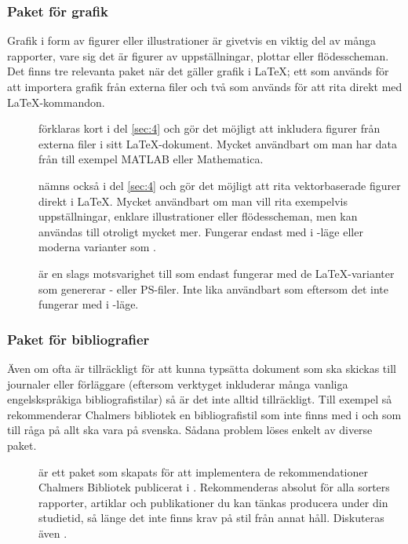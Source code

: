 \documentclass[lang=sv,ptsize=10pt,font=none,nomath,titles=bf,../../a4.tex]{subfiles}
\begin{document}
\subsubsection{Paket för grafik}
Grafik i form av figurer eller illustrationer är givetvis en viktig del
av många rapporter, vare sig det är figurer av uppställningar, plottar
eller flödesscheman. Det finns tre relevanta paket när det gäller grafik
i \LaTeX; ett som används för att importera grafik från externa filer och
två som används för att rita direkt med \LaTeX-kommandon.

\begin{description}
	\item[]
	förklaras kort i del \vref{sec:4} och gör det möjligt att inkludera
	figurer från externa filer i sitt \LaTeX-dokument. Mycket användbart
	om man har data från till exempel MATLAB eller Mathematica.
	
	\item[]
	nämns också i del \ref{sec:4} och gör det möjligt att rita
	vektorbaserade figurer direkt i \LaTeX. Mycket användbart om man
	vill rita exempelvis uppställningar, enklare illustrationer eller 
	flödesscheman, men kan användas till otroligt mycket mer. Fungerar
	endast med \pdfLaTeX{} i \PDF-läge eller moderna varianter som
	\XeTeX.

	\item[]
	är en slags motsvarighet till  som endast fungerar med de
	\LaTeX-varianter som genererar \DVI- eller \textsc{PS}-filer. Inte
	lika användbart som  eftersom det inte fungerar med 
	\pdfLaTeX{} i \PDF-läge.
\end{description}

\subsubsection{Paket för bibliografier}
Även om \BibTeX ofta är tillräckligt för att kunna typsätta dokument som
ska skickas till journaler eller förläggare (eftersom verktyget
inkluderar många vanliga engelskspråkiga bibliografistilar) så är det inte
alltid tillräckligt. Till exempel så rekommenderar Chalmers bibliotek
en bibliografistil som inte finns med i \BibTeX och som till råga på allt
ska vara på svenska. Sådana problem löses enkelt av diverse paket.

\begin{description}
	\item[\emph{}]
	är ett paket som skapats för att implementera de rekommendationer
	Chalmers Bibliotek publicerat \cite{ChsLib10} i \BibTeX.
	Rekommenderas absolut för alla sorters rapporter, artiklar och
	publikationer du kan tänkas producera under din studietid, så länge
	det inte finns krav på stil från annat håll. Diskuteras även
	.
\end{description}
\end{document}
